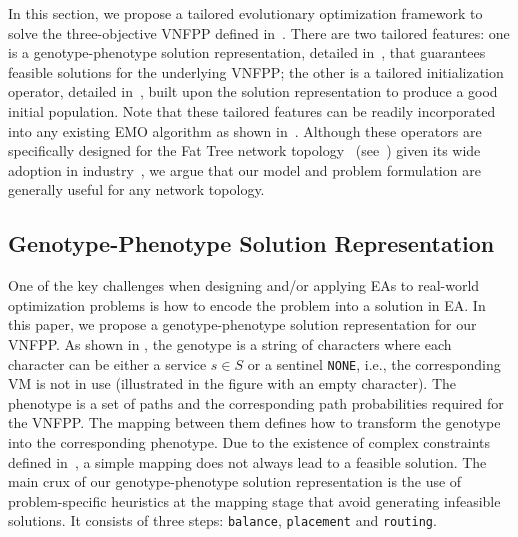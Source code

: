 In this section, we propose a tailored evolutionary optimization framework to solve the three-objective VNFPP defined in~. There are two tailored features: one is a genotype-phenotype solution representation, detailed in~, that guarantees feasible solutions for the underlying VNFPP; the other is a tailored initialization operator, detailed in~, built upon the solution representation to produce a good initial population. Note that these tailored features can be readily incorporated into any existing EMO algorithm as shown in~. Although these operators are specifically designed for the Fat Tree network topology~\cite{AlFaresLV08} (see~) given its wide adoption in industry~\cite{LebiednikMT16}, we argue that our model and problem formulation are generally useful for any network topology.

\subsection{Genotype-Phenotype Solution Representation}
\label{sec:representation}
One of the key challenges when designing and/or applying EAs to real-world optimization problems is how to encode the problem into a solution in EA. In this paper, we propose a genotype-phenotype solution representation for our VNFPP. As shown in , the genotype is a string of characters where each character can be either a service $s\in S$ or a sentinel \texttt{NONE}, i.e., the corresponding VM is not in use (illustrated in the figure with an empty character). The phenotype is a set of paths and the corresponding path probabilities required for the VNFPP. The mapping between them defines how to transform the genotype into the corresponding phenotype. Due to the existence of complex constraints defined in~, a simple mapping does not always lead to a feasible solution. The main crux of our genotype-phenotype solution representation is the use of problem-specific heuristics at the mapping stage that avoid generating infeasible solutions. It consists of three steps: \texttt{balance}, \texttt{placement} and \texttt{routing}.

